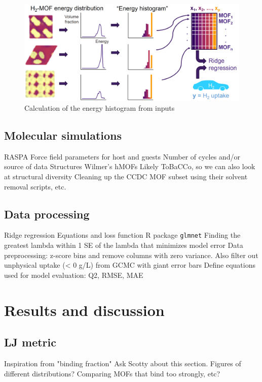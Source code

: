 \documentclass[letterpaper]{article}
\begin{document}
\begin{figure}[!ht]
	\centering
	\includegraphics[width=0.75\columnwidth]{Figs/energy_schematic.png}
	\caption{Calculation of the energy histogram from inputs}
	\label{fig:schematic}
\end{figure}


\subsection{Molecular simulations}

\begin{outline}
	\1 RASPA
	\1 Force field parameters for host and guests
	\1 Number of cycles and/or source of data
	\1 Structures
		\2 Wilmer's hMOFs
		\2 Likely ToBaCCo, so we can also look at structural diversity
		\2 Cleaning up the CCDC MOF subset using their solvent removal scripts, etc.
\end{outline}


\subsection{Data processing}

\begin{outline}
	\1 Ridge regression
		\2 Equations and loss function
		\2 R package \verb|glmnet|
			\3 Finding the greatest lambda within 1 SE of the lambda that minimizes model error
	\1 Data preprocessing: z-score bins and remove columns with zero variance.  Also filter out unphysical uptake (< 0 g/L) from GCMC with giant error bars
	\1 Define equations used for model evaluation: Q2, RMSE, MAE
\end{outline}



\section{Results and discussion}

\subsection{LJ metric}
\begin{outline}
	\1 Inspiration from "binding fraction"
	\1 Ask Scotty about this section.  Figures of different distributions?  Comparing MOFs that bind too strongly, etc?
\end{outline}
\end{document}
